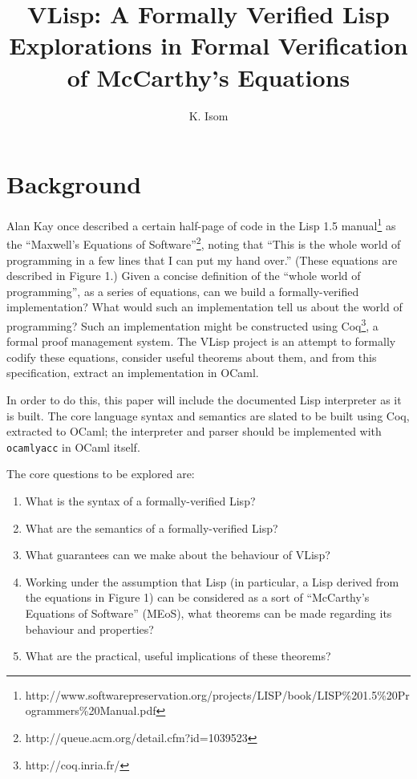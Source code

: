 \documentclass[10pt]{article}
\title {VLisp: A Formally Verified Lisp\\Explorations in Formal Verification of McCarthy's Equations}
\author{K. Isom}
\begin{document}
\maketitle

\section{Background}

Alan Kay once described a certain half-page of code in the Lisp 1.5
manual\footnote{http://www.softwarepreservation.org/projects/LISP/book/LISP\%201.5\%20Programmers\%20Manual.pdf}
as the ``Maxwell's Equations of
Software''\footnote{http://queue.acm.org/detail.cfm?id=1039523},
noting that ``This is the whole world of programming in a few lines
that I can put my hand over.'' (These equations are described in
Figure 1.) Given a concise definition of the ``whole world of
programming'', as a series of equations, can we build a
formally-verified implementation? What would such an implementation
tell us about the world of programming? Such an implementation might
be constructed using Coq\footnote{http://coq.inria.fr/}, a formal
proof management system. The VLisp project is an attempt to formally
codify these equations, consider useful theorems about them, and from
this specification, extract an implementation in OCaml.

In order to do this, this paper will include the documented Lisp
interpreter as it is built. The core language syntax and semantics are
slated to be built using Coq, extracted to OCaml; the interpreter and
parser should be implemented with \verb|ocamlyacc| in OCaml itself.

The core questions to be explored are:

\begin{enumerate}
  \item What is the syntax of a formally-verified Lisp?
  \item What are the semantics of a formally-verified Lisp?
  \item What guarantees can we make about the behaviour of VLisp?
  \item Working under the assumption that Lisp (in particular, a Lisp
    derived from the equations in Figure 1) can be considered as a
    sort of ``McCarthy's Equations of Software'' (MEoS), what theorems
    can be made regarding its behaviour and properties?
  \item What are the practical, useful implications of these theorems?
\end{enumerate}
\end{document}
